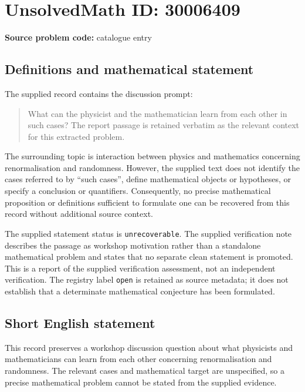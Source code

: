 \documentclass[11pt]{article}
\begin{document}
\section*{UnsolvedMath ID: 30006409}
\textbf{Source problem code:} catalogue entry
\subsection{Definitions and mathematical statement}
The supplied record contains the discussion prompt:
\begin{quote}
What can the physicist and the mathematician learn from each other in such cases? The report passage is retained verbatim as the relevant context for this extracted problem.
\end{quote}
The surrounding topic is interaction between physics and mathematics concerning renormalisation and randomness. However, the supplied text does not identify the cases referred to by ``such cases'', define mathematical objects or hypotheses, or specify a conclusion or quantifiers. Consequently, no precise mathematical proposition or definitions sufficient to formulate one can be recovered from this record without additional source context.

The supplied statement status is \texttt{unrecoverable}. The supplied verification note describes the passage as workshop motivation rather than a standalone mathematical problem and states that no separate clean statement is promoted. This is a report of the supplied verification assessment, not an independent verification. The registry label \texttt{open} is retained as source metadata; it does not establish that a determinate mathematical conjecture has been formulated.
\subsection{Short English statement}
This record preserves a workshop discussion question about what physicists and mathematicians can learn from each other concerning renormalisation and randomness. The relevant cases and mathematical target are unspecified, so a precise mathematical problem cannot be stated from the supplied evidence.
\end{document}
